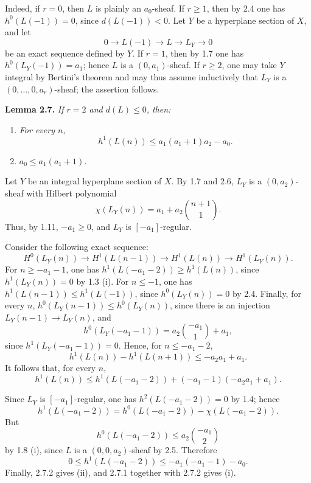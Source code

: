 Indeed, if \(r=0\), then \(L\) is plainly an \(a_0\)-sheaf. If
\(r\ge1\), then by 2.4 one has \(h^0(L(-1))=0\), since
\(d(L(-1))<0\). Let \(Y\) be a hyperplane section of \(X\), and let
\[
0\longrightarrow L(-1)\longrightarrow L\longrightarrow L_Y
\longrightarrow0
\]
be an exact sequence defined by \(Y\). If \(r=1\), then by 1.7 one has
\(h^0(L_Y(-1))=a_1\); hence \(L\) is a \((0,a_1)\)-sheaf. If \(r\ge2\),
one may take \(Y\) integral by Bertini's theorem and may thus assume
inductively that \(L_Y\) is a \((0,\ldots,0,a_r)\)-sheaf; the assertion
follows.

\textbf{Lemma 2.7.} \emph{If \(r=2\) and \(d(L)\le0\), then:}
\begin{enumerate}[label=(\roman*)]
\item \emph{For every \(n\),
\[
h^1(L(n))\le a_1(a_1+1)a_2-a_0.
\]}
\item \emph{\(a_0\le a_1(a_1+1)\).}
\end{enumerate}

Let \(Y\) be an integral hyperplane section of \(X\). By 1.7 and 2.6,
\(L_Y\) is a \((0,a_2)\)-sheaf with Hilbert polynomial
\[
\chi(L_Y(n))=a_1+a_2\binom{n+1}{1}.
\]
Thus, by 1.11, \(-a_1\ge0\), and \(L_Y\) is
\([-a_1]\)-regular.

Consider the following exact sequence:
\[
H^0(L_Y(n))\longrightarrow H^1(L(n-1))
\longrightarrow H^1(L(n))\longrightarrow H^1(L_Y(n)).
\]
For \(n\ge-a_1-1\), one has
\(h^1(L(-a_1-2))\ge h^1(L(n))\), since \(h^1(L_Y(n))=0\) by 1.3 (i).
For \(n\le-1\), one has
\(h^1(L(n-1))\le h^1(L(-1))\), since \(h^0(L_Y(n))=0\) by 2.4.
Finally, for every \(n\),
\(h^0(L_Y(n-1))\le h^0(L_Y(n))\), since there is an injection
\(L_Y(n-1)\to L_Y(n)\), and
\[
h^0(L_Y(-a_1-1))=a_2\binom{-a_1}{1}+a_1,
\]
since \(h^1(L_Y(-a_1-1))=0\). Hence, for \(n\le-a_1-2\),
\[
h^1(L(n))-h^1(L(n+1))\le -a_2a_1+a_1.
\]
It follows that, for every \(n\),
\begin{equation}
h^1(L(n))\le
h^1(L(-a_1-2))+(-a_1-1)(-a_2a_1+a_1).
\tag{2.7.1}
\end{equation}

Since \(L_Y\) is \([-a_1]\)-regular, one has
\(h^2(L(-a_1-2))=0\) by 1.4; hence
\[
h^1(L(-a_1-2))
=h^0(L(-a_1-2))-\chi(L(-a_1-2)).
\]
But
\[
h^0(L(-a_1-2))\le a_2\binom{-a_1}{2}
\]
by 1.8 (i), since \(L\) is a \((0,0,a_2)\)-sheaf by 2.5. Therefore
\begin{equation}
0\le h^1(L(-a_1-2))\le -a_1(-a_1-1)-a_0.
\tag{2.7.2}
\end{equation}
Finally, 2.7.2 gives (ii), and 2.7.1 together with 2.7.2 gives (i).

